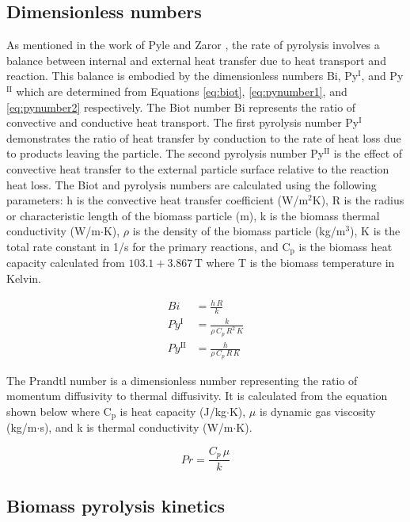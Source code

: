 \documentclass{article}
\begin{document}
\subsection{Dimensionless numbers}

As mentioned in the work of Pyle and Zaror \cite{Pyle-1984}, the rate of pyrolysis involves a balance between internal and external heat transfer due to heat transport and reaction. This balance is embodied by the dimensionless numbers Bi, Py$^\text{I}$, and Py$^\text{II}$ which are determined from Equations \ref{eq:biot}, \ref{eq:pynumber1}, and \ref{eq:pynumber2} respectively. The Biot number Bi represents the ratio of convective and conductive heat transport. The first pyrolysis number Py$^\text{I}$ demonstrates the ratio of heat transfer by conduction to the rate of heat loss due to products leaving the particle. The second pyrolysis number Py$^\text{II}$ is the effect of convective heat transfer to the external particle surface relative to the reaction heat loss. The Biot and pyrolysis numbers are calculated using the following parameters: h is the convective heat transfer coefficient (W/m$^2$K), R is the radius or characteristic length of the biomass particle (m), k is the biomass thermal conductivity (W/m$\cdot$K), $\rho$ is the density of the biomass particle (kg/m$^3$), K is the total rate constant in 1/s for the primary reactions, and C$_\text{p}$ is the biomass heat capacity calculated from $103.1 + 3.867\,\text{T}$ where T is the biomass temperature in Kelvin.

\begin{align}
    Bi &= \frac{h\,R}{k} \label{eq:biot} \\
    Py^{\textrm{I}} &= \frac{k}{\rho\,C_p\,R^2\,K} \label{eq:pynumber1} \\
    Py^{\textrm{II}} &= \frac{h}{\rho\,C_p\,R\,K} \label{eq:pynumber2}
\end{align}

The Prandtl number is a dimensionless number representing the ratio of momentum diffusivity to thermal diffusivity. It is calculated from the equation shown below where C$_\text{p}$ is heat capacity (J/kg$\cdot$K), $\mu$ is dynamic gas viscosity (kg/m$\cdot$s), and k is thermal conductivity (W/m$\cdot$K).

\begin{equation}
    Pr = \frac{C_p\, \mu}{k}
\end{equation}

\subsection{Biomass pyrolysis kinetics}
\end{document}
